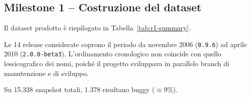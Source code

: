 \subsection{Milestone 1 -- Costruzione del dataset}

Il dataset prodotto è riepilogato in Tabella~\ref{tab:r1-summary}.

Le 14 release considerate coprono il periodo da novembre 2006 (\texttt{0.9.6}) ad aprile
2010 (\texttt{2.0.0-beta3}). L'ordinamento cronologico non coincide con quello lessicografico
dei nomi, poiché il progetto sviluppava in parallelo branch di manutenzione e di sviluppo.

Su 15.338 snapshot totali, 1.378 risultano buggy ($\approx$9\%).